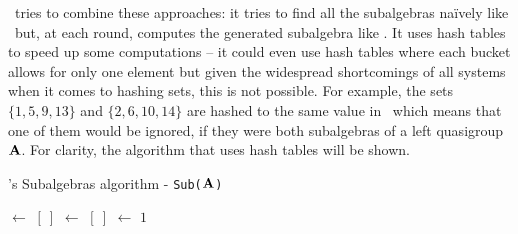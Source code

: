 \Software~tries to combine these approaches: it tries to find all the subalgebras naïvely like \rig~but, at each round, computes the generated subalgebra like \cream. It uses hash tables to speed up some computations -- it could even use hash tables where each bucket allows for only one element but given the widespread shortcomings of all systems when it comes to hashing sets, this is not possible. For example, the sets $\{1, 5, 9, 13\}$ and $\{2,6,10,14\}$ are hashed to the same value in \magma~which means that one of them would be ignored, if they were both subalgebras of a left quasigroup $\mathbf{A}$. \newline For clarity, the algorithm that uses hash tables will be shown.\newline\newline
\begin{algorithm}[H]
\label{quandlerunSubs}
\DontPrintSemicolon
\caption{\Software's Subalgebras algorithm - \texttt{Sub($\mathbf{A}$)} }


\BlankLine
\BlankLine
\subalgebras $\leftarrow$ $[~]$\;
\hashtable $\leftarrow$ $[~]$\;
\index $\leftarrow$ $1$\;
\Return{\subalgebras}



\end{algorithm}
